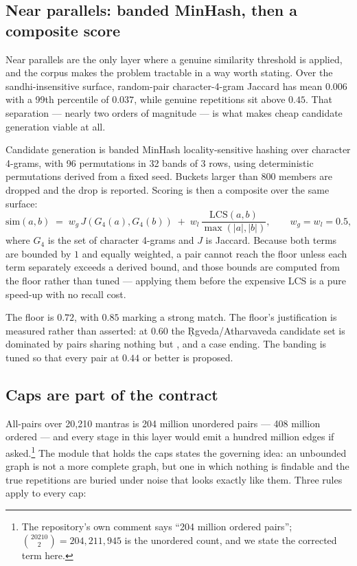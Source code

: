 \subsection{Near parallels: banded MinHash, then a composite score}
\label{sec:near}

Near parallels are the only layer where a genuine similarity threshold is applied,
and the corpus makes the problem tractable in a way worth stating. Over the
sandhi-insensitive surface, random-pair character-4-gram Jaccard has mean $0.006$
with a 99th percentile of $0.037$, while genuine repetitions sit above $0.45$. That
separation --- nearly two orders of magnitude --- is what makes cheap candidate
generation viable at all.

Candidate generation is banded MinHash locality-sensitive hashing over character
4-grams, with 96 permutations in 32 bands of 3 rows, using deterministic
permutations derived from a fixed seed. Buckets larger than 800 members are dropped
and the drop is reported. Scoring is then a composite over the same surface:
\[
  \mathrm{sim}(a,b) \;=\; w_{g}\,J\!\left(G_4(a), G_4(b)\right) \;+\;
                          w_{l}\,\frac{\mathrm{LCS}(a,b)}{\max(|a|,|b|)},
  \qquad w_{g}=w_{l}=0.5,
\]
where $G_4$ is the set of character 4-grams and $J$ is Jaccard. Because both terms
are bounded by $1$ and equally weighted, a pair cannot reach the floor unless each
term separately exceeds a derived bound, and those bounds are computed from the
floor rather than tuned --- applying them before the expensive \mbox{LCS} is a pure
speed-up with no recall cost.

The floor is $0.72$, with $0.85$ marking a strong match. The floor's justification
is measured rather than asserted: at $0.60$ the \d{R}gveda/Atharvaveda candidate set
is dominated by pairs sharing nothing but ,  and a case
ending. The banding is tuned so that every pair at $0.44$ or better is proposed.

\subsection{Caps are part of the contract}
\label{sec:caps}

All-pairs over 20{,}210 mantras is 204 million unordered pairs --- 408 million
ordered --- and every stage in this layer would emit a hundred million edges if
asked.\footnote{The repository's own comment says ``204 million ordered pairs'';
$\binom{20210}{2}=204{,}211{,}945$ is the unordered count, and we state the
corrected term here.} The module that holds the
caps states the governing idea: an unbounded graph is not a more complete graph, but
one in which nothing is findable and the true repetitions are buried under noise
that looks exactly like them. Three rules apply to every cap:

